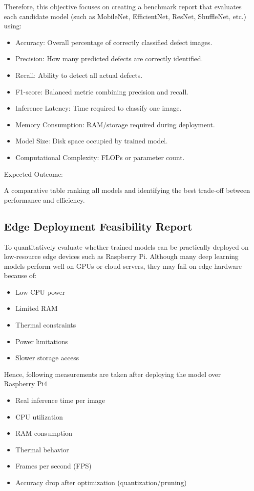 Therefore, this objective focuses on creating a benchmark report that evaluates each candidate model (such as MobileNet, EfficientNet, ResNet, ShuffleNet, etc.) using:
\begin{itemize}
\item Accuracy: Overall percentage of correctly classified defect images.
\item Precision: How many predicted defects are correctly identified.
\item Recall: Ability to detect all actual defects.
\item F1-score: Balanced metric combining precision and recall.
\item Inference Latency: Time required to classify one image.
\item Memory Consumption: RAM/storage required during deployment.
\item Model Size: Disk space occupied by trained model.
\item Computational Complexity: FLOPs or parameter count.
\end{itemize}
Expected Outcome:

A comparative table ranking all models and identifying the best trade-off between performance and efficiency.

\subsection {Edge Deployment Feasibility Report}
To quantitatively evaluate whether trained models can be practically deployed on low-resource edge devices such as Raspberry Pi.
Although many deep learning models perform well on GPUs or cloud servers, they may fail on edge hardware because of:
\begin{itemize}
\item Low CPU power
\item Limited RAM
\item Thermal constraints
\item Power limitations
\item Slower storage access
\end{itemize}

Hence, following measurements are taken after deploying the model over Raspberry Pi4
\begin{itemize}
\item Real inference time per image
\item CPU utilization
\item RAM consumption
\item Thermal behavior
\item Frames per second (FPS)
\item Accuracy drop after optimization (quantization/pruning)
\end{itemize}


